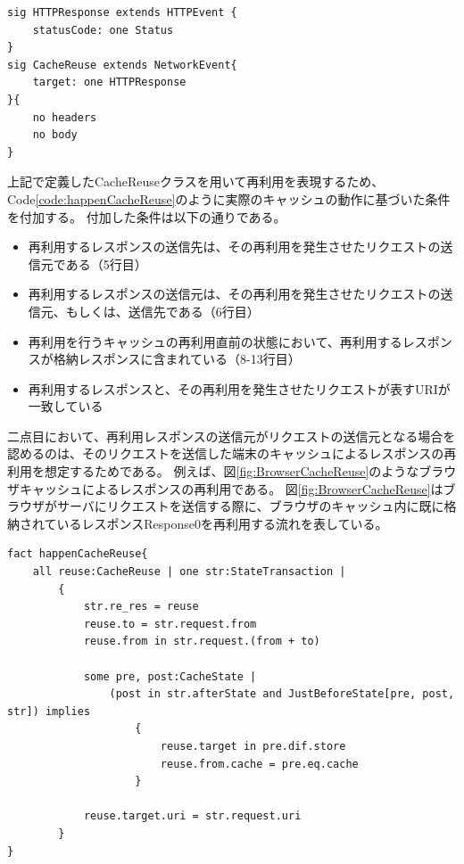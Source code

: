 \documentclass[12pt,a4paper]{jbook}
\begin{document}
\begin{lstlisting}[caption=CacheReuseクラス, label=code:CacheReuseClass]
sig HTTPResponse extends HTTPEvent {
	statusCode: one Status
}
sig CacheReuse extends NetworkEvent{
	target: one HTTPResponse
}{
	no headers
	no body
}
\end{lstlisting}

上記で定義したCacheReuseクラスを用いて再利用を表現するため、Code\ref{code:happenCacheReuse}のように実際のキャッシュの動作に基づいた条件を付加する。
付加した条件は以下の通りである。
\begin{itemize}
\item 再利用するレスポンスの送信先は、その再利用を発生させたリクエストの送信元である（5行目）
\item 再利用するレスポンスの送信元は、その再利用を発生させたリクエストの送信元、もしくは、送信先である（6行目）
\item 再利用を行うキャッシュの再利用直前の状態において、再利用するレスポンスが格納レスポンスに含まれている（8-13行目）
\item 再利用するレスポンスと、その再利用を発生させたリクエストが表すURIが一致している
\end{itemize}
二点目において、再利用レスポンスの送信元がリクエストの送信元となる場合を認めるのは、そのリクエストを送信した端末のキャッシュによるレスポンスの再利用を想定するためである。
例えば、図\ref{fig:BrowserCacheReuse}のようなブラウザキャッシュによるレスポンスの再利用である。
図\ref{fig:BrowserCacheReuse}はブラウザがサーバにリクエストを送信する際に、ブラウザのキャッシュ内に既に格納されているレスポンスResponse0を再利用する流れを表している。

\begin{lstlisting}[caption=CacheReuseの発生条件, label=code:happenCacheReuse]
fact happenCacheReuse{
	all reuse:CacheReuse | one str:StateTransaction |
		{
			str.re_res = reuse
			reuse.to = str.request.from
			reuse.from in str.request.(from + to)

			some pre, post:CacheState |
				(post in str.afterState and JustBeforeState[pre, post, str]) implies
					{
						reuse.target in pre.dif.store
						reuse.from.cache = pre.eq.cache
					}

			reuse.target.uri = str.request.uri
		}
}
\end{lstlisting}
\end{document}
